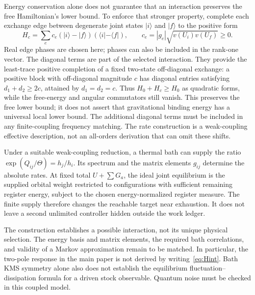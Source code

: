 \documentclass[11pt]{article}
\begin{document}
Energy conservation alone does not guarantee that an interaction preserves
the free Hamiltonian's lower bound. To enforce that stronger property,
complete each exchange edge between degenerate joint states $|i\rangle$
and $|f\rangle$ to the positive form
\begin{equation}\label{eq:positiveedge}
 H_c=\sum_e c_e(|i\rangle-|f\rangle)(\langle i|-\langle f|),
 \qquad c_e=|g_e|\sqrt{v(U_i)v(U_f)}\ge0.
\end{equation}
Real edge phases are chosen here; phases can also be included in the
rank-one vector. The diagonal terms are part of the selected interaction.
They provide the least-trace positive completion of a fixed two-state
off-diagonal exchange: a positive block with off-diagonal magnitude $c$
has diagonal entries satisfying $d_1+d_2\ge2c$, attained by $d_1=d_2=c$.
Thus $H_0+H_c\ge H_0$ as quadratic forms, while the free-energy and angular
commutators still vanish. This preserves the free lower bound; it does not
assert that gravitational binding energy has a universal local lower bound.
The additional diagonal terms must be included in any finite-coupling
frequency matching. The rate construction is a weak-coupling effective
description, not an all-orders derivation that can omit these shifts.

Under a suitable weak-coupling reduction, a thermal bath can supply the
ratio $\exp(Q_{ij}/\Theta)=h_j/h_i$. Its spectrum and the matrix elements
$g_{ij}$ determine the absolute rates. At fixed total $U+\sum G_a$, the
ideal joint equilibrium is the supplied orbital weight restricted to
configurations with sufficient remaining register energy, subject to the
chosen energy-normalized register measure. The finite supply therefore
changes the reachable target near exhaustion. It does not leave a second
unlimited controller hidden outside the work ledger.

The construction establishes a possible interaction, not its unique
physical selection. The energy basis and matrix elements, the required
bath correlations, and validity of a Markov approximation remain to be
matched. In particular, the two-pole response in the main paper is not
derived by writing~\eqref{eq:Hint}. Bath KMS symmetry alone also does not
establish the equilibrium fluctuation--dissipation formula for a driven
stock observable. Quantum noise must be checked in this coupled model.
\end{document}
